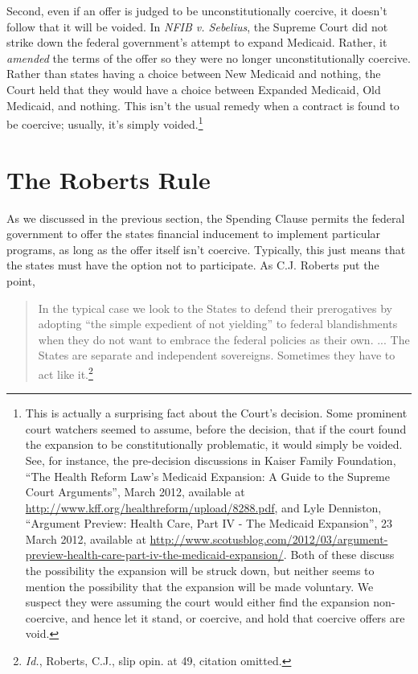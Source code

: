 \documentclass[
  11pt,
  letterpaper,
  DIV=11,
  numbers=noendperiod,
  twoside]{scrartcl}
\begin{document}
Second, even if an offer is judged to be unconstitutionally coercive, it
doesn't follow that it will be voided. In \emph{NFIB v. Sebelius}, the
Supreme Court did not strike down the federal government's attempt to
expand Medicaid. Rather, it \emph{amended} the terms of the offer so
they were no longer unconstitutionally coercive. Rather than states
having a choice between New Medicaid and nothing, the Court held that
they would have a choice between Expanded Medicaid, Old Medicaid, and
nothing. This isn't the usual remedy when a contract is found to be
coercive; usually, it's simply voided.\footnote{This is actually a
  surprising fact about the Court's decision. Some prominent court
  watchers seemed to assume, before the decision, that if the court
  found the expansion to be constitutionally problematic, it would
  simply be voided. See, for instance, the pre-decision discussions in
  Kaiser Family Foundation, ``The Health Reform Law's Medicaid
  Expansion: A Guide to the Supreme Court Arguments'', March 2012,
  available at \url{http://www.kff.org/healthreform/upload/8288.pdf},
  and Lyle Denniston, ``Argument Preview: Health Care, Part IV - The
  Medicaid Expansion'', 23 March 2012, available at
  \url{http://www.scotusblog.com/2012/03/argument-preview-health-care-part-iv-the-medicaid-expansion/}.
  Both of these discuss the possibility the expansion will be struck
  down, but neither seems to mention the possibility that the expansion
  will be made voluntary. We suspect they were assuming the court would
  either find the expansion non-coercive, and hence let it stand, or
  coercive, and hold that coercive offers are void.}

\section{The Roberts Rule}\label{the-roberts-rule}

As we discussed in the previous section, the Spending Clause permits the
federal government to offer the states financial inducement to implement
particular programs, as long as the offer itself isn't coercive.
Typically, this just means that the states must have the option not to
participate. As C.J. Roberts put the point,

\begin{quote}
In the typical case we look to the States to defend their prerogatives
by adopting ``the simple expedient of not yielding'' to federal
blandishments when they do not want to embrace the federal policies as
their own. ... The States are separate and independent sovereigns.
Sometimes they have to act like it.\footnote{\emph{Id.}, Roberts, C.J.,
  slip opin. at 49, citation omitted.}
\end{quote}
\end{document}
